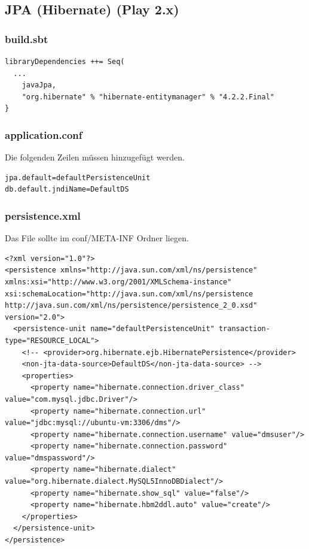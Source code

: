 \documentclass[11pt, a4paper]{article}
\begin{document}
\subsection{JPA (Hibernate) (Play 2.x)}

\subsubsection*{build.sbt}

\begin{lstlisting}
libraryDependencies ++= Seq(
  ...
	javaJpa,
	"org.hibernate" % "hibernate-entitymanager" % "4.2.2.Final"
}\end{lstlisting}

\subsubsection*{application.conf}

Die folgenden Zeilen müssen hinzugefügt werden.

\begin{lstlisting}
jpa.default=defaultPersistenceUnit
db.default.jndiName=DefaultDS
\end{lstlisting}

\subsubsection*{persistence.xml}

Das File sollte im conf/META-INF Ordner liegen.

\begin{lstlisting}
<?xml version="1.0"?>
<persistence xmlns="http://java.sun.com/xml/ns/persistence" xmlns:xsi="http://www.w3.org/2001/XMLSchema-instance" xsi:schemaLocation="http://java.sun.com/xml/ns/persistence http://java.sun.com/xml/ns/persistence/persistence_2_0.xsd" version="2.0">
  <persistence-unit name="defaultPersistenceUnit" transaction-type="RESOURCE_LOCAL">
    <!-- <provider>org.hibernate.ejb.HibernatePersistence</provider>
    <non-jta-data-source>DefaultDS</non-jta-data-source> -->
    <properties>
      <property name="hibernate.connection.driver_class" value="com.mysql.jdbc.Driver"/>
      <property name="hibernate.connection.url" value="jdbc:mysql://ubuntu-vm:3306/dms"/>
      <property name="hibernate.connection.username" value="dmsuser"/>
      <property name="hibernate.connection.password" value="dmspassword"/>
      <property name="hibernate.dialect" value="org.hibernate.dialect.MySQL5InnoDBDialect"/>
      <property name="hibernate.show_sql" value="false"/>
      <property name="hibernate.hbm2ddl.auto" value="create"/>
    </properties>
  </persistence-unit>
</persistence>
\end{lstlisting}
\end{document}
